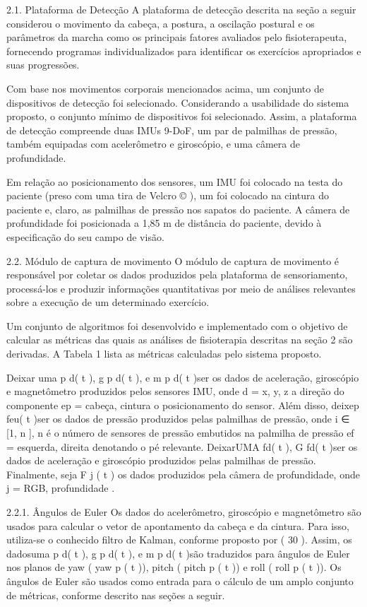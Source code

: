 \documentclass[10pt,a4paper,compsoc]{IEEEtran}
\begin{document}
2.1. Plataforma de Detecção
A plataforma de detecção descrita na seção a seguir considerou o movimento da cabeça, a postura, a oscilação postural e os parâmetros da marcha como os principais fatores avaliados pelo fisioterapeuta, fornecendo programas individualizados para identificar os exercícios apropriados e suas progressões.

Com base nos movimentos corporais mencionados acima, um conjunto de dispositivos de detecção foi selecionado. Considerando a usabilidade do sistema proposto, o conjunto mínimo de dispositivos foi selecionado. Assim, a plataforma de detecção compreende duas IMUs 9-DoF, um par de palmilhas de pressão, também equipadas com acelerômetro e giroscópio, e uma câmera de profundidade.

Em relação ao posicionamento dos sensores, um IMU foi colocado na testa do paciente (preso com uma tira de Velcro © ), um foi colocado na cintura do paciente e, claro, as palmilhas de pressão nos sapatos do paciente. A câmera de profundidade foi posicionada a 1,85 m de distância do paciente, devido à especificação do seu campo de visão.

2.2. Módulo de captura de movimento
O módulo de captura de movimento é responsável por coletar os dados produzidos pela plataforma de sensoriamento, processá-los e produzir informações quantitativas por meio de análises relevantes sobre a execução de um determinado exercício.

Um conjunto de algoritmos foi desenvolvido e implementado com o objetivo de calcular as métricas das quais as análises de fisioterapia descritas na seção 2 são derivadas. A Tabela 1 lista as métricas calculadas pelo sistema proposto.

Deixar uma{ p }d( t ), g{ p }d( t ), e m{ p }d( t )ser os dados de aceleração, giroscópio e magnetômetro produzidos pelos sensores IMU, onde d = { x, y, z } a direção do componente ep = { cabeça, cintura } o posicionamento do sensor. Além disso, deixep{ f}eu( t )ser os dados de pressão produzidos pelas palmilhas de pressão, onde i ∈ [1, n ], n é o número de sensores de pressão embutidos na palmilha de pressão ef = { esquerda, direita } denotando o pé relevante. DeixarUMA{ f}d( t ), G{ f}d( t )ser os dados de aceleração e giroscópio produzidos pelas palmilhas de pressão. Finalmente, seja F j ( t ) os dados produzidos pela câmera de profundidade, onde j = { RGB, profundidade }.

2.2.1. Ângulos de Euler
Os dados do acelerômetro, giroscópio e magnetômetro são usados ​​para calcular o vetor de apontamento da cabeça e da cintura. Para isso, utiliza-se o conhecido filtro de Kalman, conforme proposto por ( 30 ). Assim, os dadosuma{ p }d( t ), g{ p }d( t ), e m{ p }d( t )são traduzidos para ângulos de Euler nos planos de yaw ( yaw { p } ( t )), pitch ( pitch { p } ( t )) e roll ( roll { p } ( t )). Os ângulos de Euler são usados ​​como entrada para o cálculo de um amplo conjunto de métricas, conforme descrito nas seções a seguir.
\end{document}

